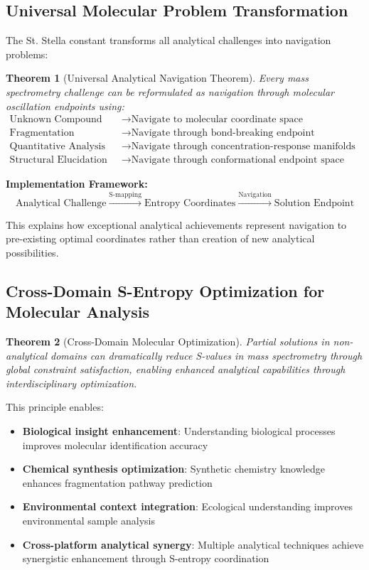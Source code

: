 \documentclass[11pt,a4paper]{article}
\newtheorem{theorem}{Theorem}[section]
\theoremstyle{remark}
\begin{document}
\subsection{Universal Molecular Problem Transformation}

The St. Stella constant transforms all analytical challenges into navigation problems:

\begin{theorem}[Universal Analytical Navigation Theorem]
Every mass spectrometry challenge can be reformulated as navigation through molecular oscillation endpoints using:
\begin{align}
\text{Unknown Compound ID} &\rightarrow \text{Navigate to molecular coordinate space} \\
\text{Fragmentation Analysis} &\rightarrow \text{Navigate through bond-breaking endpoint distributions} \\
\text{Quantitative Analysis} &\rightarrow \text{Navigate through concentration-response manifolds} \\
\text{Structural Elucidation} &\rightarrow \text{Navigate through conformational endpoint space}
\end{align}
\end{theorem}

\textbf{Implementation Framework:}
$$\text{Analytical Challenge} \xrightarrow{\text{S-mapping}} \text{Entropy Coordinates} \xrightarrow{\text{Navigation}} \text{Solution Endpoint}$$

This explains how exceptional analytical achievements represent navigation to pre-existing optimal coordinates rather than creation of new analytical possibilities.

\subsection{Cross-Domain S-Entropy Optimization for Molecular Analysis}

\begin{theorem}[Cross-Domain Molecular Optimization]
Partial solutions in non-analytical domains can dramatically reduce S-values in mass spectrometry through global constraint satisfaction, enabling enhanced analytical capabilities through interdisciplinary optimization.
\end{theorem}

This principle enables:
\begin{itemize}
\item \textbf{Biological insight enhancement}: Understanding biological processes improves molecular identification accuracy
\item \textbf{Chemical synthesis optimization}: Synthetic chemistry knowledge enhances fragmentation pathway prediction
\item \textbf{Environmental context integration}: Ecological understanding improves environmental sample analysis
\item \textbf{Cross-platform analytical synergy}: Multiple analytical techniques achieve synergistic enhancement through S-entropy coordination
\end{itemize}
\end{document}
